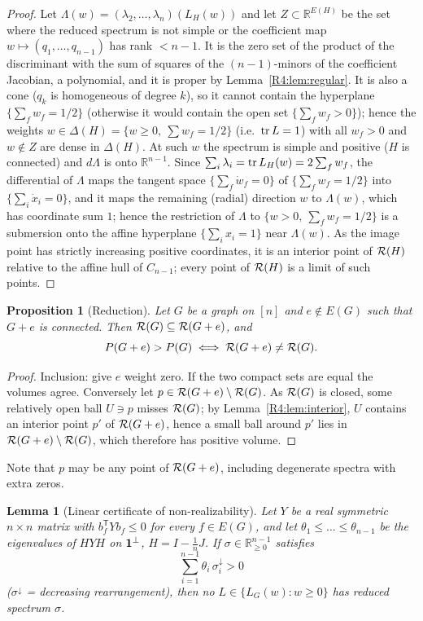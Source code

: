 \documentclass[11pt]{amsart}
\newtheorem{lemma}[theorem]{Lemma}
\newtheorem{proposition}[theorem]{Proposition}
\theoremstyle{definition}
\theoremstyle{remark}
\providecommand{\R}{\mathbb R}
\begin{document}
\begin{proof}
Let $\Lambda(w)=(\lambda_2,\dots,\lambda_n)(L_H(w))$ and let $Z\subset
\R^{E(H)}$ be the set where the reduced spectrum is not simple or the
coefficient map $w\mapsto(q_1,\dots,q_{n-1})$ has rank $<n-1$.  It is the
zero set of the product of the discriminant with the sum of squares of
the $(n-1)$-minors of the coefficient Jacobian, a polynomial, and it is
proper by Lemma~\ref{R4:lem:regular}.  It is also a cone ($q_k$ is
homogeneous of degree $k$), so it cannot contain the hyperplane
$\{\sum_f w_f=1/2\}$ (otherwise it would contain the open set
$\{\sum_fw_f>0\}$); hence the weights $w\in\Delta(H)=\{w\ge0,\ \sum
w_f=1/2\}$ (i.e.\ $\operatorname{tr} L=1$) with all $w_f>0$ and $w\notin Z$ are dense in
$\Delta(H)$.  At such $w$ the spectrum is simple and positive ($H$ is
connected) and $d\Lambda$ is onto $\R^{n-1}$.  Since $\sum_i\lambda_i=\operatorname{tr}
L_H(w)=2\sum_fw_f$, the differential of $\Lambda$ maps the tangent space
$\{\sum_f\dot w_f=0\}$ of $\{\sum_fw_f=1/2\}$ into $\{\sum_i\dot x_i=0\}$, and
it maps the remaining (radial) direction $w$ to $\Lambda(w)$, which has
coordinate sum $1$; hence the restriction of $\Lambda$ to
$\{w>0,\ \sum_fw_f=1/2\}$ is a submersion onto the affine hyperplane
$\{\sum_ix_i=1\}$ near $\Lambda(w)$.  As the image point has strictly increasing positive
coordinates, it is an interior point of $\mathcal{R}(H)$ relative to the affine
hull of $C_{n-1}$; every point of $\mathcal{R}(H)$ is a limit of such points.
\end{proof}

\begin{proposition}[Reduction]\label{R4:prop:reduction}
Let $G$ be a graph on $[n]$ and $e\notin E(G)$ such that $G+e$ is
connected.  Then $\mathcal{R}(G)\subseteq\mathcal{R}(G+e)$, and
\[
 P(G+e)>P(G)\iff \mathcal{R}(G+e)\neq\mathcal{R}(G).
\]
\end{proposition}

\begin{proof}
Inclusion: give $e$ weight zero.  If the two compact sets are equal the
volumes agree.  Conversely let $p\in\mathcal{R}(G+e)\setminus\mathcal{R}(G)$.  As
$\mathcal{R}(G)$ is closed, some relatively open ball $U\ni p$ misses $\mathcal{R}(G)$; by
Lemma~\ref{R4:lem:interior}, $U$ contains an interior point $p'$ of
$\mathcal{R}(G+e)$, hence a small ball around $p'$ lies in
$\mathcal{R}(G+e)\setminus\mathcal{R}(G)$, which therefore has positive volume.
\end{proof}

Note that $p$ may be any point of $\mathcal{R}(G+e)$, including degenerate
spectra with extra zeros.

\begin{lemma}[Linear certificate of non-realizability]\label{R4:lem:cert}
Let $Y$ be a real symmetric $n\times n$ matrix with
$b_f^{\mathsf T}Yb_f\le 0$ for every $f\in E(G)$, and let
$\theta_1\le\dots\le\theta_{n-1}$ be the eigenvalues of $HYH$ on $\mathbf{1}^\perp$,
$H=I-\frac1nJ$.  If $\sigma\in\R^{n-1}_{\ge0}$ satisfies
\begin{equation}\label{R4:eq:cert}
 \sum_{i=1}^{n-1}\theta_i\,\sigma_i^{\downarrow}>0
\end{equation}
($\sigma^\downarrow$ = decreasing rearrangement), then no
$L\in\{L_G(w):w\ge0\}$ has reduced spectrum $\sigma$.
\end{lemma}
\end{document}
